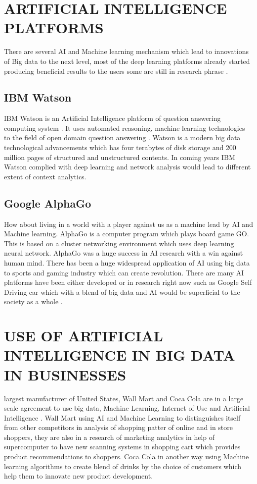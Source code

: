 \documentclass[sigconf]{acmart}
\begin{document}
\section{ARTIFICIAL INTELLIGENCE PLATFORMS}
There are several AI and Machine learning mechanism which lead to innovations of Big data to the next level, most of the deep learning platforms already started producing beneficial results to the users some are still in research phrase \cite{editor03}.

\subsection{IBM Watson}
IBM Watson is an Artificial Intelligence platform of question answering computing system \cite{editor04}.  It uses automated reasoning, machine learning technologies to the field of open domain question answering \cite{editor04}. Watson is a modern big data technological advancements which has four terabytes of disk storage and 200 million pages of structured and unstructured contents. In coming years IBM Watson complied with deep learning and network analysis would lead to different extent of context analytics.

\subsection{Google AlphaGo}
How about living in a world with a player against us as a machine lead by AI and Machine learning. AlphaGo is a computer program which plays board game GO. This is based on a cluster networking environment which uses deep learning neural network. AlphaGo was a huge success in AI research with a win against human mind. There has been a huge widespread application of AI using big data to sports and gaming industry which can create revolution. There are many AI platforms have been either developed or in research right now such as Google Self Driving car which with a blend of big data and AI would be superficial to the society as a whole \cite{editor04}.

\section{USE OF ARTIFICIAL INTELLIGENCE IN BIG DATA IN BUSINESSES }
largest manufacturer of United States, Wall Mart and Coca Cola are in a large scale agreement to use big data, Machine Learning, Internet of Use and Artificial Intelligence \cite{editor05}. Wall Mart using AI and Machine Learning to distinguishes itself from other competitors in analysis of shopping patter of online and in store shoppers, they are also in a research of marketing analytics in help of supercomputer to have new scanning systems in shopping cart which provides product recommendations to shoppers. Coca Cola in another way using Machine learning algorithms to create blend of drinks by the choice of customers which help them to innovate new product development. 
\end{document}

